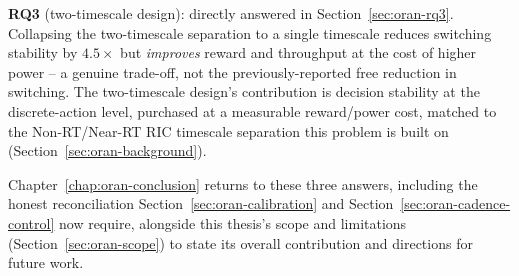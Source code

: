 \textbf{RQ3} (two-timescale design): directly answered in
Section~\ref{sec:oran-rq3}. Collapsing the two-timescale separation to a
single timescale reduces switching stability by $4.5\times$ but
\emph{improves} reward and throughput at the cost of higher power -- a
genuine trade-off, not the previously-reported free reduction in
switching. The two-timescale design's contribution is decision stability
at the discrete-action level, purchased at a measurable reward/power
cost, matched to the Non-RT/Near-RT RIC timescale separation this problem
is built on (Section~\ref{sec:oran-background}).

Chapter~\ref{chap:oran-conclusion} returns to these three answers,
including the honest reconciliation Section~\ref{sec:oran-calibration}
and Section~\ref{sec:oran-cadence-control} now require, alongside this
thesis's scope and limitations (Section~\ref{sec:oran-scope}) to state
its overall contribution and directions for future work.

